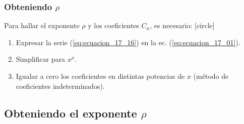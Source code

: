 \documentclass[12pt]{beamer}
\begin{document}
\begin{frame}
\frametitle{Obteniendo $\rho$}
Para hallar el exponente $\rho$ y los coeficientes $C_{n}$, es necesario:
[circle]
\begin{enumerate}[<+->]
\item Expresar la serie (\ref{eq:ecuacion_17_16}) en la ec. (\ref{eq:ecuacion_17_01}).
\item Simplificar para $x^{\rho}$.
\item Igualar a cero los coeficientes en distintas potencias de $x$ (método de coeficientes indeterminados).
\end{enumerate}
\end{frame}

\subsection{Obteniendo el exponente \texorpdfstring{$\rho$}{r}}
\end{document}
